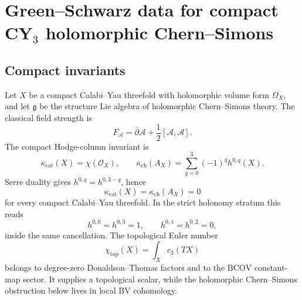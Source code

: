 
\providecommand{\kch}{\kappa_{\mathrm{ch}}}
\providecommand{\kcat}{\kappa_{\mathrm{cat}}}
\providecommand{\kBKM}{\kappa_{\mathrm{BKM}}}
\providecommand{\kfiber}{\kappa_{\mathrm{fiber}}}
\providecommand{\kanom}{\kappa_{\mathrm{anom}}}
\providecommand{\hCS}{\mathrm{hCS}}
\providecommand{\QME}{\mathrm{QME}}
\providecommand{\BCOV}{\mathrm{BCOV}}
\providecommand{\CC}{\mathbb{C}}
\providecommand{\QQ}{\mathbb{Q}}
\providecommand{\gfrak}{\mathfrak{g}}
\providecommand{\hdual}{h^{\vee}}
\providecommand{\Tr}{\mathrm{tr}}
\providecommand{\cA}{\mathcal{A}}
\providecommand{\cO}{\mathcal{O}}
\providecommand{\ch}{\mathrm{ch}}
\providecommand{\chitop}{\chi_{\mathrm{top}}}
\providecommand{\Loc}{\mathrm{Loc}}
\providecommand{\TCFT}{\mathrm{TCFT}}
\providecommand{\CoHA}{\mathrm{CoHA}}
\providecommand{\cW}{\mathcal{W}}
\providecommand{\Yplus}{Y^+}
\providecommand{\SpCh}{\mathrm{SpCh}}
\providecommand{\PhiFA}{\Phi^{\mathrm{FA}}}
\providecommand{\Rep}{\mathrm{Rep}}
\providecommand{\cZ}{\mathcal{Z}}
\providecommand{\Eone}{E_1}
\providecommand{\Etwo}{E_2}

\section{Green--Schwarz data for compact CY$_3$ holomorphic
Chern--Simons}
\label{sec:generic-cy3-GS}

\subsection{Compact invariants}

Let \(X\) be a compact Calabi--Yau threefold with holomorphic volume
form \(\Omega_X\), and let \(\gfrak\) be the structure Lie algebra of
holomorphic Chern--Simons theory.  The classical field strength is
\[
  F_\cA=\bar\partial\cA+\frac{1}{2}[\cA,\cA].
\]
The compact Hodge-column invariant is
\[
  \kcat(X)=\chi(\cO_X),\qquad
  \kch(A_X)=\sum_{q=0}^{3}(-1)^q h^{0,q}(X).
\]
Serre duality gives \(h^{0,q}=h^{0,3-q}\), hence
\[
  \kcat(X)=\kch(A_X)=0
\]
for every compact Calabi--Yau threefold.  In the strict holonomy
stratum this reads
\[
  h^{0,0}=h^{0,3}=1,\qquad h^{0,1}=h^{0,2}=0,
\]
inside the same cancellation.
The topological Euler number
\[
  \chitop(X)=\int_X c_3(TX)
\]
belongs to degree-zero Donaldson--Thomas factors and to the \(\BCOV\)
constant-map sector.  It supplies a topological scalar, while the
holomorphic Chern--Simons obstruction below lives in local BV
cohomology.

